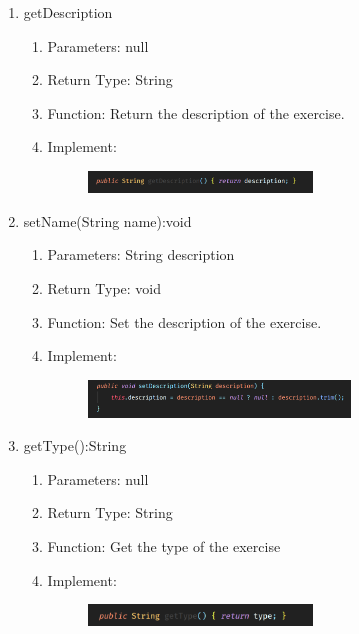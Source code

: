 \documentclass[16pt]{scrreprt}
\begin{document}
\begin{enumerate}
	\item getDescription
	\begin{enumerate}
		\item Parameters: null
		\item Return Type: String
		\item Function: Return the description of the exercise.
		\item Implement:
		\begin{figure}[H]
	\centering
	\includegraphics[width=0.6\textwidth]{diagrams/ex-getdesc.png}\\
\end{figure}
\end{enumerate}

	\item setName(String name):void
	\begin{enumerate}
		\item Parameters: String description
		\item Return Type: void
		\item Function: Set the description of the exercise.
		\item Implement:
		\begin{figure}[H]
	\centering
	\includegraphics[width=0.7\textwidth]{diagrams/ex-setdesc.png}\\
\end{figure}
	\end{enumerate}
	
	\item getType():String
	\begin{enumerate}
		\item Parameters: null
		\item Return Type: String
		\item Function: Get the type of the exercise
		\item Implement:
		\begin{figure}[H]
	\centering
	\includegraphics[width=0.6\textwidth]{diagrams/ex-gettype.png}\\
\end{figure}
	\end{enumerate}
	

\end{enumerate}
\end{document}
